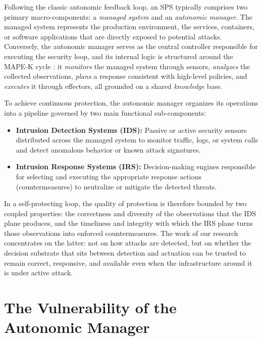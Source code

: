 Following the classic autonomic feedback loop, an SPS typically comprises two primary macro-components: a \textit{managed system} and an \textit{autonomic manager}. The managed system represents the production environment, the services, containers, or software applications that are directly exposed to potential attacks. Conversely, the autonomic manager serves as the central controller responsible for executing the security loop, and its internal logic is structured around the MAPE-K cycle \cite{kephart2003vision}: it \emph{monitors} the managed system through sensors, \emph{analyzes} the collected observations, \emph{plans} a response consistent with high-level policies, and \emph{executes} it through effectors, all grounded on a shared \emph{knowledge} base.

To achieve continuous protection, the autonomic manager organizes its operations into a pipeline governed by two main functional sub-components:
\begin{itemize}
    \item \textbf{Intrusion Detection Systems (IDS):} Passive or active security sensors distributed across the managed system to monitor traffic, logs, or system calls and detect anomalous behavior or known attack signatures.
    \item \textbf{Intrusion Response Systems (IRS):} Decision-making engines responsible for selecting and executing the appropriate response actions (countermeasures) to neutralize or mitigate the detected threats.
\end{itemize}

In a self-protecting loop, the quality of protection is therefore bounded by two coupled properties: the correctness and diversity of the observations that the IDS plane produces, and the timeliness and integrity with which the IRS plane turns those observations into enforced countermeasures. The work of our research concentrates on the latter: not on how attacks are detected, but on whether the decision substrate that sits between detection and actuation can be trusted to remain correct, responsive, and available even when the infrastructure around it is under active attack.

\section{The Vulnerability of the Autonomic Manager}
\label{sec:intro_vulnerability}

